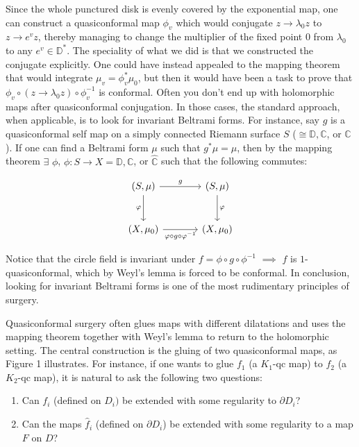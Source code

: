 \documentclass[11pt,a4paper]{article}
\begin{document}
        Since the whole punctured disk is evenly covered by the exponential map, one can construct a quasiconformal map $\phi_v$ which would conjugate $z \rightarrow \lambda_0z$ to $z \rightarrow e^vz$, thereby managing to change the multiplier of the fixed point $0$ from $\lambda_0$ to any $e^v \in \mathbb{D}^*$. The speciality of what we did is that we constructed the conjugate explicitly. One could have instead appealed to the mapping theorem that would integrate $\mu_v = \phi_v^*\mu_0$, but then it would have been a task to prove that $\phi_v \circ (z \rightarrow \lambda_0z) \circ \phi_v^{-1}$ is conformal. Often you don't end up with holomorphic maps after quasiconformal conjugation. In those cases, the standard approach, when applicable, is to look for invariant Beltrami forms. For instance, say $g$ is a quasiconformal self map on a simply connected Riemann surface $S$ ($\cong \mathbb{D}, \mathbb{C}$, or $\hat{\mathbb{C}}$). If one can find a Beltrami form $\mu$ such that $g^*\mu = \mu$, then by the mapping theorem $\exists$  $\phi$, $\phi: S \rightarrow X = \mathbb{D}, \mathbb{C}$, or $\hat{\mathbb{C}}$ such that the following commutes:

        $$\begin{tikzcd}[column sep = large, row sep = large]
        (S, \mu) \arrow[r, "g"] \arrow[d, "\phi"']
        & (S, \mu) \arrow[d, "\phi"] \\
        (X, \mu_0) \arrow[r,"\phi \circ g \circ \phi^{-1}"']
        & (X, \mu_0)
        \end{tikzcd}$$


        Notice that the circle field is invariant under $f = \phi \circ g \circ \phi^{-1}$ $\implies$ $f$ is $1$-quasiconformal, which by Weyl's lemma is forced to be conformal. In conclusion, looking for invariant Beltrami forms is one of the most rudimentary principles of surgery.

        Quasiconformal surgery often glues maps with different dilatations and uses the mapping theorem together with Weyl's lemma to return to the holomorphic setting. The central construction is the gluing of two quasiconformal maps, as Figure 1 illustrates. For instance, if one wants to glue $f_1$ (a $K_1$-qc map) to $f_2$ (a $K_2$-qc map), it is natural to ask the following two questions:

        \begin{enumerate}
            \item Can $f_i$ (defined on $D_i)$ be extended with some regularity to $\partial D_i$?
            \item Can the maps $\hat{f}_i$ (defined on $\partial D_i$) be extended with some regularity to a map $F$ on $D$?
        \end{enumerate}
\end{document}
